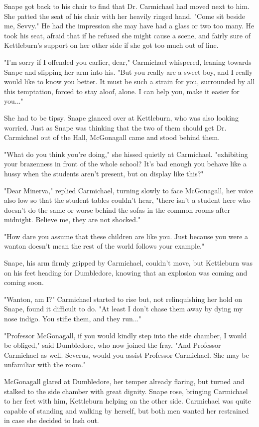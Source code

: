Snape got back to his chair to find that Dr. Carmichael had moved next to him. She patted the seat of his chair with her heavily ringed hand. "Come sit beside me, Sevvy." He had the impression she may have had a glass or two too many. He took his seat, afraid that if he refused she might cause a scene, and fairly sure of Kettleburn's support on her other side if she got too much out of line.

"I'm sorry if I offended you earlier, dear," Carmichael whispered, leaning towards Snape and slipping her arm into his. "But you really are a sweet boy, and I really would like to know you better. It must be such a strain for you, surrounded by all this temptation, forced to stay aloof, alone. I can help you, make it easier for you..."

She had to be tipsy. Snape glanced over at Kettleburn, who was also looking worried. Just as Snape was thinking that the two of them should get Dr. Carmichael out of the Hall, McGonagall came and stood behind them.

"What do you think you're doing," she hissed quietly at Carmichael. "exhibiting your brazenness in front of the whole school? It's bad enough you behave like a hussy when the students aren't present, but on display like this?"

"Dear Minerva," replied Carmichael, turning slowly to face McGonagall, her voice also low so that the student tables couldn't hear, "there isn't a student here who doesn't do the same or worse behind the sofas in the common rooms after midnight. Believe me, they are not shocked."

"How dare you assume that these children are like you. Just because you were a wanton doesn't mean the rest of the world follows your example."

Snape, his arm firmly gripped by Carmichael, couldn't move, but Kettleburn was on his feet heading for Dumbledore, knowing that an explosion was coming and coming soon.

"Wanton, am I?" Carmichael started to rise but, not relinquishing her hold on Snape, found it difficult to do. "At least I don't chase them away by dying my nose indigo. You stifle them, and they run..."

"Professor McGonagall, if you would kindly step into the side chamber, I would be obliged," said Dumbledore, who now joined the fray. "And Professor Carmichael as well. Severus, would you assist Professor Carmichael. She may be unfamiliar with the room."

McGonagall glared at Dumbledore, her temper already flaring, but turned and stalked to the side chamber with great dignity. Snape rose, bringing Carmichael to her feet with him, Kettleburn helping on the other side. Carmichael was quite capable of standing and walking by herself, but both men wanted her restrained in case she decided to lash out.

